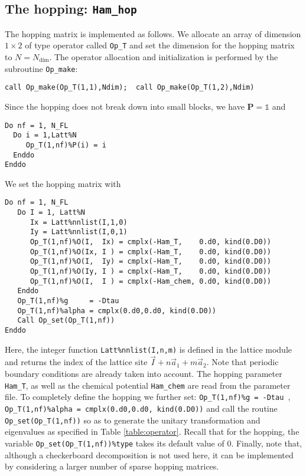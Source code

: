 \subsection{The hopping: \texttt{Ham\_hop}} \label{U_PV_Ham_hop}

The hopping matrix is implemented as follows. 
We allocate an array of dimension $1\times 2$ of type operator  called \texttt{Op\_T} and set the  dimension for the hopping  matrix to $N=N_{\mathrm{dim}}$. The operator allocation and initialization is performed by the subroutine \texttt{Op\_make}: 
\begin{lstlisting}[style=fortran]
call Op_make(Op_T(1,1),Ndim);  call Op_make(Op_T(1,2),Ndim) 
\end{lstlisting}
Since the hopping  does not  break down into small blocks, we have ${\bm P}=\mathds{1}$   and  
\begin{lstlisting}[style=fortran]
Do nf = 1, N_FL
  Do i = 1,Latt%N
     Op_T(1,nf)%P(i) = i
  Enddo
Enddo
\end{lstlisting}
We set the hopping matrix  with 
\begin{lstlisting}[style=fortran]
Do nf = 1, N_FL
   Do I = 1, Latt%N
      Ix = Latt%nnlist(I,1,0)
      Iy = Latt%nnlist(I,0,1)
      Op_T(1,nf)%O(I,  Ix) = cmplx(-Ham_T,    0.d0, kind(0.D0))
      Op_T(1,nf)%O(Ix, I ) = cmplx(-Ham_T,    0.d0, kind(0.D0))
      Op_T(1,nf)%O(I,  Iy) = cmplx(-Ham_T,    0.d0, kind(0.D0))
      Op_T(1,nf)%O(Iy, I ) = cmplx(-Ham_T,    0.d0, kind(0.D0))
      Op_T(1,nf)%O(I,  I ) = cmplx(-Ham_chem, 0.d0, kind(0.D0))
   Enddo
   Op_T(1,nf)%g     = -Dtau
   Op_T(1,nf)%alpha = cmplx(0.d0,0.d0, kind(0.D0))
   Call Op_set(Op_T(1,nf))
Enddo
\end{lstlisting}
Here, the integer function \texttt{Latt\%nnlist(I,n,m)} is defined in the lattice module and returns the index of the lattice site $ \vec{I} +  n \vec{a}_1 +  m \vec{a}_2$.
Note that periodic boundary conditions are 
already taken into account.  The hopping parameter \texttt{Ham\_T}, as well as the chemical potential \texttt{Ham\_chem} are read from the parameter file.  
To completely define the hopping  we further set: \texttt{Op\_T(1,nf)\%g = -Dtau }, \texttt{Op\_T(1,nf)\%alpha = cmplx(0.d0,0.d0, kind(0.D0))} and call the routine  \texttt{Op\_set(Op\_T(1,nf))}  so as to generate  the unitary transformation and eigenvalues as specified in Table \ref{table:operator}.  Recall that for the hopping, the variable  \texttt{Op\_set(Op\_T(1,nf))\%type}  takes its default value of 0.  
Finally, note that, although a checkerboard decomposition is not used here, it can be implemented by considering a larger number of sparse hopping matrices.  


